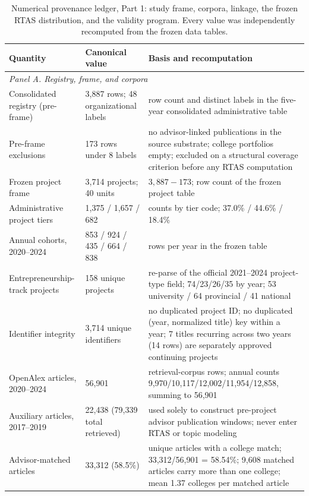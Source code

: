 \documentclass[a4paper,11pt]{article}
\begin{document}
\begin{table}[H]
\centering
\caption{Numerical provenance ledger, Part 1: study frame, corpora, linkage, the frozen RTAS distribution, and the validity program. Every value was independently recomputed from the frozen data tables.}
\label{tab:s3}
\scriptsize
\begin{tabular}{p{1.55in}p{1.05in}p{3.15in}}
\toprule
\textbf{Quantity} & \textbf{Canonical value} & \textbf{Basis and recomputation}\\
\midrule
\multicolumn{3}{l}{\textit{Panel A. Registry, frame, and corpora}}\\
\midrule
Consolidated registry (pre-frame) & 3,887 rows; 48 organizational labels & row count and distinct labels in the five-year consolidated administrative table\\
Pre-frame exclusions & 173 rows under 8 labels & no advisor-linked publications in the source substrate; college portfolios empty; excluded on a structural coverage criterion before any RTAS computation\\
Frozen project frame & 3,714 projects; 40 units & $3{,}887-173$; row count of the frozen project table\\
Administrative project tiers & 1,375 / 1,657 / 682 & counts by tier code; 37.0\% / 44.6\% / 18.4\%\\
Annual cohorts, 2020--2024 & 853 / 924 / 435 / 664 / 838 & rows per year in the frozen table\\
Entrepreneurship-track projects & 158 unique projects & re-parse of the official 2021--2024 project-type field; 74/23/26/35 by year; 53 university / 64 provincial / 41 national\\
Identifier integrity & 3,714 unique identifiers & no duplicated project ID; no duplicated (year, normalized title) key within a year; 7 titles recurring across two years (14 rows) are separately approved continuing projects\\
OpenAlex articles, 2020--2024 & 56,901 & retrieval-corpus rows; annual counts 9,970/10,117/12,002/11,954/12,858, summing to 56,901\\
Auxiliary articles, 2017--2019 & 22,438 (79,339 total retrieved) & used solely to construct pre-project advisor publication windows; never enter RTAS or topic modeling\\
Advisor-matched articles & 33,312 (58.5\%) & unique articles with a college match; 33,312/56,901 = 58.54\%; 9,608 matched articles carry more than one college; mean 1.37 colleges per matched article\\

\end{tabular}
\end{table}
\end{document}

